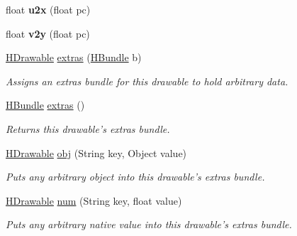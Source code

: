 \begin{DoxyCompactItemize}
\item 
\hypertarget{classhype_1_1core_1_1drawable_1_1_h_drawable_a413417e1dd124e78ed176bdadb643ad9}{float {\bfseries u2x} (float pc)}\label{classhype_1_1core_1_1drawable_1_1_h_drawable_a413417e1dd124e78ed176bdadb643ad9}

\item 
\hypertarget{classhype_1_1core_1_1drawable_1_1_h_drawable_ada692012a68140bad4c31649cccfbe78}{float {\bfseries v2y} (float pc)}\label{classhype_1_1core_1_1drawable_1_1_h_drawable_ada692012a68140bad4c31649cccfbe78}

\item 
\hyperlink{classhype_1_1core_1_1drawable_1_1_h_drawable}{H\-Drawable} \hyperlink{classhype_1_1core_1_1drawable_1_1_h_drawable_ab25de02ec7eb6cd806ab7fb9f9f6150f}{extras} (\hyperlink{classhype_1_1core_1_1util_1_1_h_bundle}{H\-Bundle} b)
\begin{DoxyCompactList}\small\item\em Assigns an {\itshape extras bundle} for this drawable to hold arbitrary data. \end{DoxyCompactList}\item 
\hyperlink{classhype_1_1core_1_1util_1_1_h_bundle}{H\-Bundle} \hyperlink{classhype_1_1core_1_1drawable_1_1_h_drawable_a3111c7ead30122880433c3244be5680a}{extras} ()
\begin{DoxyCompactList}\small\item\em Returns this drawable's {\itshape extras bundle}. \end{DoxyCompactList}\item 
\hyperlink{classhype_1_1core_1_1drawable_1_1_h_drawable}{H\-Drawable} \hyperlink{classhype_1_1core_1_1drawable_1_1_h_drawable_a6cf0a0516360437ff2d404ba9f89e565}{obj} (String key, Object value)
\begin{DoxyCompactList}\small\item\em Puts any arbitrary object into this drawable's {\itshape extras bundle}. \end{DoxyCompactList}\item 
\hyperlink{classhype_1_1core_1_1drawable_1_1_h_drawable}{H\-Drawable} \hyperlink{classhype_1_1core_1_1drawable_1_1_h_drawable_afb065431d9ff439c42b82cab8ff2d7db}{num} (String key, float value)
\begin{DoxyCompactList}\small\item\em Puts any arbitrary native value into this drawable's {\itshape extras bundle}. \end{DoxyCompactList}\item 

\end{DoxyCompactItemize}
